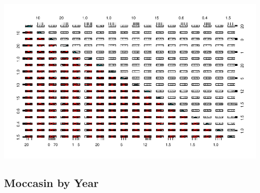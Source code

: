 \documentclass[11pt]{article}\usepackage[]{graphicx}\usepackage[]{color}
\makeatletter
\def\maxwidth{ %
  \ifdim\Gin@nat@width>\linewidth
    \linewidth
  \else
    \Gin@nat@width
  \fi
}
\newenvironment{knitrout}{}{} %
\makeatother
\begin{document}
\begin{knitrout}
{}




{\centering \includegraphics[width=\maxwidth]{figure/bz-4} 

}



\end{knitrout}

\subsection{Moccasin by Year}
\end{document}
